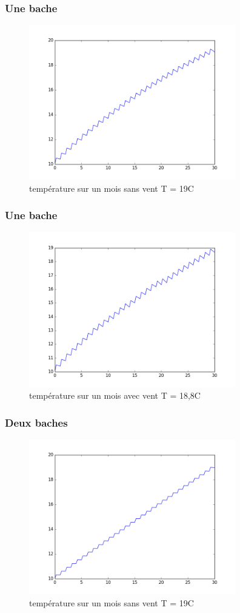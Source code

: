 \documentclass{beamer}
\begin{document}
  \begin{frame}
   \frametitle{Une bache}
   \begin{figure}[ht!]
    \centering
    \includegraphics[width=90mm]{1b_sv.png}
    \caption{température sur un mois sans vent T = 19C \label{overflow}}
   \end{figure}
  \end{frame}
  \begin{frame}
  \frametitle{Une bache}
   \begin{figure}[ht!]
    \centering
    \includegraphics[width=90mm]{1b_v.png}
    \caption{température sur un mois avec vent T = 18,8C \label{overflow}}
   \end{figure}
  \end{frame}
  \begin{frame}
   \frametitle{Deux baches}
   \begin{figure}[ht!]
    \centering
    \includegraphics[width=90mm]{2b_sv.png}
    \caption{température sur un mois sans vent T = 19C \label{overflow}}
   \end{figure}
  \end{frame}
\end{document}
